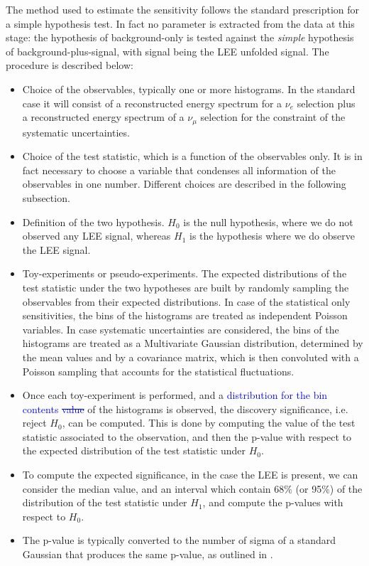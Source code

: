 \documentclass[a4paper]{article}
\newcommand{\nue}{$\nu_e$ }
\newcommand{\numu}{$\nu_{\mu}$ }
\begin{document}
The method used to estimate the sensitivity follows the standard prescription for a simple hypothesis test.
In fact no parameter is extracted from the data at this stage: the hypothesis of background-only is tested against the \textit{simple} hypothesis of background-plus-signal, with signal being the LEE unfolded signal.
The procedure is described below:
\begin{itemize}
    \item Choice of the observables, typically one or more histograms. In the standard case it will consist of a reconstructed energy spectrum for a \nue selection plus a reconstructed energy spectrum of a \numu selection for the constraint of the systematic uncertainties.
    \item Choice of the test statistic, which is a function of the observables only. It is in fact necessary to choose a variable that condenses all information of the observables in one number. Different choices are described in the following subsection.
    \item Definition of the two hypothesis. $H_0$ is the null hypothesis, where we do not observed any LEE signal, whereas $H_1$ is the hypothesis where we do observe the LEE signal.
    \item Toy-experiments or pseudo-experiments. The expected distributions of the test statistic under the two hypotheses are built by randomly sampling the observables from their expected distributions. In case of the statistical only sensitivities, the bins of the histograms are treated as independent Poisson variables. In case systematic uncertainties are considered, the bins of the histograms are treated as a Multivariate Gaussian distribution, determined by the mean values and by a covariance matrix, which is then convoluted with a Poisson sampling that accounts for the statistical fluctuations.
    \item Once each toy-experiment is performed, and a \textcolor{blue}{distribution for the bin contents \st{value}} of the histograms is observed, the discovery significance, i.e. reject $H_0$, can be computed. This is done by computing the value of the test statistic associated to the observation, and then the p-value with respect to the expected distribution of the test statistic under $H_0$.
    \item To compute the expected significance, in the case the LEE is present, we can consider the median value, and an interval which contain 68\% (or 95\%) of the distribution of the test statistic under $H_1$, and compute the p-values with respect to $H_0$.
    \item The p-value is typically converted to the number of sigma of a standard Gaussian that produces the same p-value, as outlined in \cite{bib:cowan}.
\end{itemize}
\end{document}
